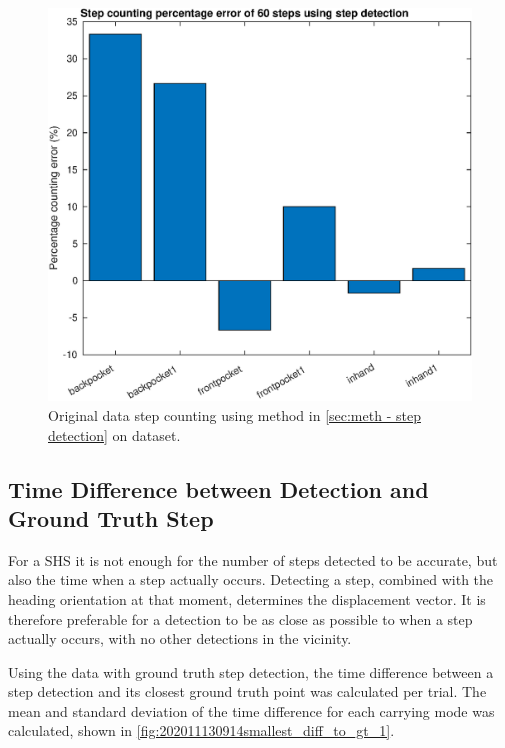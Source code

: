 \begin{figure}[H]
	\centering
	\includegraphics[width=0.7\linewidth]{images/20201127_1640_Step_counting_percentage_error_of_60_steps_using_step_detection}
	\setlength{\belowcaptionskip}{-20pt}
	\caption{Original data step counting using method in \cref{sec:meth - step detection} on \citet{Brajdic2013} dataset.}
	\label{fig:202009291013step_counting_error_of_60_steps}
\end{figure}

\subsection{Time Difference between Detection and Ground Truth Step}

For a \ac{SHS} it is not enough for the number of steps detected to be accurate, but also the time when a step actually occurs. Detecting a step, combined with the heading orientation at that moment, determines the displacement vector. It is therefore preferable for a detection to be as close as possible to when a step actually occurs, with no other detections in the vicinity. \par
Using the \citet{Salvi2018} data with ground truth step detection, the time difference between a step detection and its closest ground truth point was calculated per trial. The mean and standard deviation of the time difference for each carrying mode was calculated, shown in \cref{fig:202011130914smallest_diff_to_gt_1}. 


